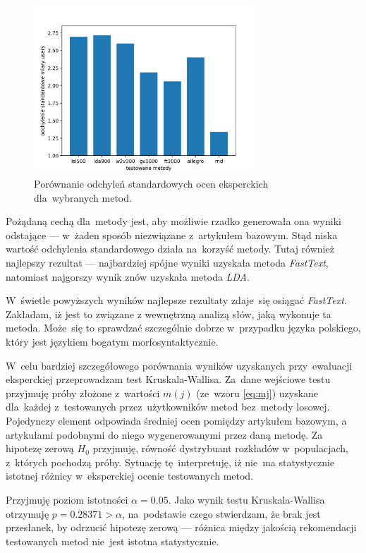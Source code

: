 \documentclass[pl]{minipw} %
\begin{document}
\begin{figure}[H]
	\centering
	\includegraphics[width=0.75\textwidth]{img/results/lsi500_lda900_w2v300_gv1000_ft1000_allegro_rnd_users_std.png}
	\caption{Porównanie odchyleń standardowych ocen eksperckich dla~wybranych metod.}
\end{figure}

Pożądaną cechą dla~metody jest, aby możliwie rzadko generowała ona wyniki odstające --- w~żaden sposób niezwiązane z~artykułem bazowym. Stąd niska wartość odchylenia standardowego działa na~korzyść metody. Tutaj również najlepszy rezultat --- najbardziej spójne wyniki uzyskała metoda \textit{FastText}, natomiast najgorszy wynik znów uzyskała metoda \textit{LDA}.

W~świetle powyższych wyników najlepsze rezultaty zdaje~się osiągać \textit{FastText}. Zakładam, iż jest to związane z wewnętrzną analizą słów, jaką wykonuje ta metoda. Może~się to sprawdzać szczególnie dobrze w~przypadku języka polskiego, który jest językiem bogatym morfosyntaktycznie.

W~celu bardziej szczegółowego porównania wyników uzyskanych przy~ewaluacji eksperckiej przeprowadzam test Kruskala-Wallisa. Za~dane wejściowe testu przyjmuję próby złożone z~wartości $m(j)$ (ze~wzoru \ref{eq:mj}) uzyskane dla~każdej z~testowanych przez~użytkowników metod bez~metody losowej. Pojedynczy element odpowiada średniej ocen pomiędzy artykułem bazowym, a artykułami podobnymi do niego wygenerowanymi przez daną metodę. Za hipotezę zerową $H_0$ przyjmuję, równość dystrybuant rozkładów w~populacjach, z~których pochodzą próby. Sytuację tę interpretuję, iż nie~ma statystycznie istotnej różnicy w~eksperckiej ocenie testowanych metod.

Przyjmuję poziom istotności $\alpha=0.05$. Jako wynik testu Kruskala-Wallisa otrzymuję $p=0.28371>\alpha$, na~podstawie czego stwierdzam, że brak jest przesłanek, by odrzucić hipotezę zerową --- różnica między jakością rekomendacji testowanych metod nie~jest istotna statystycznie.
\end{document}
